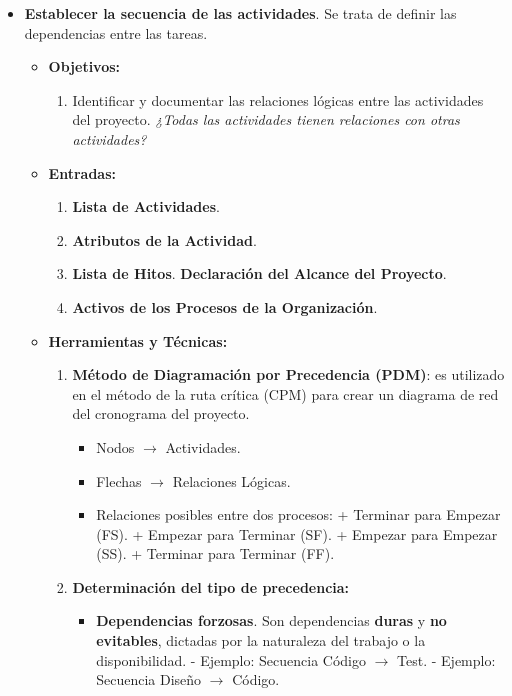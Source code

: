 \documentclass[10pt,a4paper]{article}
\begin{document}
\begin{itemize}
\item \textbf{Establecer la secuencia de las actividades}. Se trata de definir las dependencias entre las tareas.

\begin{itemize}
\item \textbf{Objetivos:}
\begin{enumerate}
\item Identificar y documentar las relaciones lógicas entre las actividades del proyecto. \textit{¿Todas las actividades tienen relaciones con otras actividades?}
\end{enumerate}

\item \textbf{Entradas:}
\begin{enumerate}
\item \textbf{Lista de Actividades}.
\item \textbf{Atributos de la Actividad}.
\item \textbf{Lista de Hitos}.
\textbf{Declaración del Alcance del Proyecto}.
\item \textbf{Activos de los Procesos de la Organización}.
\end{enumerate}

\item \textbf{Herramientas y Técnicas:}
\begin{enumerate}
\item \textbf{Método de Diagramación por Precedencia (PDM)}: es utilizado en
el método de la ruta crítica (CPM) para crear un diagrama de red del
cronograma del proyecto.
\begin{itemize}
\item Nodos $\rightarrow$ Actividades.
\item Flechas $\rightarrow$ Relaciones Lógicas.
\item Relaciones posibles entre dos procesos:
\subitem + Terminar para Empezar (FS).
\subitem + Empezar para Terminar (SF).
\subitem + Empezar para Empezar (SS).
\subitem + Terminar para Terminar (FF).
\end{itemize}
\item \textbf{Determinación del tipo de precedencia:}
\begin{itemize}
\item \textbf{Dependencias forzosas}.
Son dependencias \textbf{duras} y \textbf{no evitables}, dictadas por la naturaleza del trabajo o la disponibilidad.
\subitem - Ejemplo: Secuencia Código $\rightarrow$ Test.
\subitem - Ejemplo: Secuencia Diseño $\rightarrow$ Código.


\end{itemize}
\end{enumerate}
\end{itemize}
\end{itemize}
\end{document}
